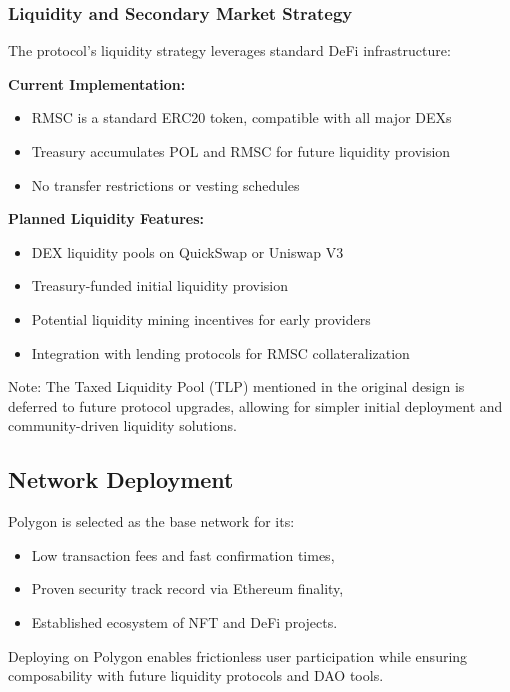 \documentclass[conference]{IEEEtran}
\begin{document}
\subsubsection{Liquidity and Secondary Market Strategy}

The protocol's liquidity strategy leverages standard DeFi infrastructure:

\textbf{Current Implementation:}
\begin{itemize}
    \item RMSC is a standard ERC20 token, compatible with all major DEXs
    \item Treasury accumulates POL and RMSC for future liquidity provision
    \item No transfer restrictions or vesting schedules
\end{itemize}

\textbf{Planned Liquidity Features:}
\begin{itemize}
    \item DEX liquidity pools on QuickSwap or Uniswap V3
    \item Treasury-funded initial liquidity provision
    \item Potential liquidity mining incentives for early providers
    \item Integration with lending protocols for RMSC collateralization
\end{itemize}

Note: The Taxed Liquidity Pool (TLP) mentioned in the original design is deferred to future protocol upgrades, allowing for simpler initial deployment and community-driven liquidity solutions.


\subsection{Network Deployment}

Polygon is selected as the base network for its:
\begin{itemize}
    \item Low transaction fees and fast confirmation times,
    \item Proven security track record via Ethereum finality,
    \item Established ecosystem of NFT and DeFi projects.
\end{itemize}

Deploying on Polygon enables frictionless user participation while ensuring composability with future liquidity protocols and DAO tools.
\end{document}
